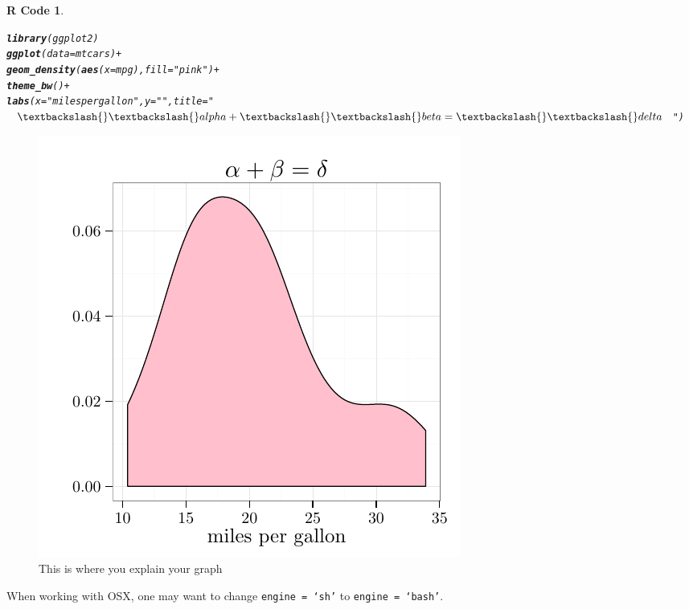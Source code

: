 \documentclass{article}\usepackage[]{graphicx}\usepackage[]{color}
\makeatletter
\newcommand{\hlstr}[1]{\textcolor[rgb]{0.192,0.494,0.8}{#1}}%
\newcommand{\hlopt}[1]{\textcolor[rgb]{0,0,0}{#1}}%
\newcommand{\hlstd}[1]{\textcolor[rgb]{0.345,0.345,0.345}{#1}}%
\newcommand{\hlkwc}[1]{\textcolor[rgb]{0.333,0.667,0.333}{#1}}%
\newcommand{\hlkwd}[1]{\textcolor[rgb]{0.737,0.353,0.396}{\textbf{#1}}}%
\newenvironment{kframe}{%
 \def\at@end@of@kframe{}%
 \ifinner\ifhmode%
  \def\at@end@of@kframe{\end{minipage}}%
  \begin{minipage}{\columnwidth}%
 \fi\fi%
 \def\FrameCommand##1{\hskip\@totalleftmargin \hskip-\fboxsep
 \colorbox{shadecolor}{##1}\hskip-\fboxsep
     \hskip-\linewidth \hskip-\@totalleftmargin \hskip\columnwidth}%
 \MakeFramed {\advance\hsize-\width
   \@totalleftmargin\z@ \linewidth\hsize
   \@setminipage}}%
 {\par\unskip\endMakeFramed%
 \at@end@of@kframe}
\newenvironment{knitrout}{}{} %
\theoremstyle{rcode}
\newtheorem{rcode}{R Code}[section]
\makeatother
\begin{document}
\begin{knitrout}
\color{fgcolor}\begin{kframe}
\begin{rcode}\label{Graph}\hfill{}\begin{alltt}
\hlkwd{library}\hlstd{(ggplot2)}
\hlkwd{ggplot}\hlstd{(}\hlkwc{data} \hlstd{= mtcars)} \hlopt{+}
  \hlkwd{geom_density}\hlstd{(}\hlkwd{aes}\hlstd{(}\hlkwc{x} \hlstd{= mpg),} \hlkwc{fill} \hlstd{=} \hlstr{"pink"}\hlstd{)} \hlopt{+}
  \hlkwd{theme_bw}\hlstd{()} \hlopt{+}
  \hlkwd{labs}\hlstd{(}\hlkwc{x} \hlstd{=} \hlstr{"miles per gallon"}\hlstd{,} \hlkwc{y} \hlstd{=} \hlstr{""}\hlstd{,} \hlkwc{title} \hlstd{=} \hlstr{"$\textbackslash{}\textbackslash{}alpha + \textbackslash{}\textbackslash{}beta = \textbackslash{}\textbackslash{}delta$"}\hlstd{)}
\end{alltt}
\end{rcode}\end{kframe}
\end{knitrout}


\begin{figure}[h]
\begin{knitrout}
\color{fgcolor}

{\centering \includegraphics[width=.5\textwidth]{figure/GraphShow} 

}



\end{knitrout}

\caption{This is where you explain your graph \label{graphDude}}
\end{figure}

\clearpage

When working with OSX, one may want to change \texttt{engine = `sh'} to \texttt{engine = `bash'}.
\end{document}
